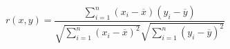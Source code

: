 \begin{equation}
\label{eq:pearson}
    r(x, y)=\frac{\sum_{i=1}^{n}\left(x_{i}-\overline{x}\right)\left(y_{i}-\overline{y}\right)}{\sqrt{\sum_{i=1}^{n}\left(x_{i}-\overline{x}\right)^{2}} \sqrt{\sum_{i=1}^{n}\left(y_{i}-\overline{y}\right)^{2}}}
\end{equation}